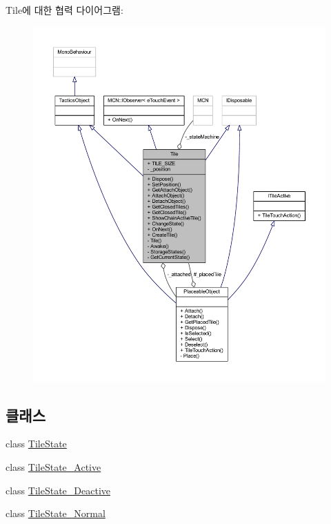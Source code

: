 Tile에 대한 협력 다이어그램\+:\nopagebreak
\begin{figure}[H]
\begin{center}
\leavevmode
\includegraphics[width=350pt]{class_tile__coll__graph}
\end{center}
\end{figure}
\subsection*{클래스}
\begin{DoxyCompactItemize}
\item 
class \hyperlink{class_tile_1_1_tile_state}{Tile\+State}
\item 
class \hyperlink{class_tile_1_1_tile_state___active}{Tile\+State\+\_\+\+Active}
\item 
class \hyperlink{class_tile_1_1_tile_state___deactive}{Tile\+State\+\_\+\+Deactive}
\item 
class \hyperlink{class_tile_1_1_tile_state___normal}{Tile\+State\+\_\+\+Normal}
\end{DoxyCompactItemize}
